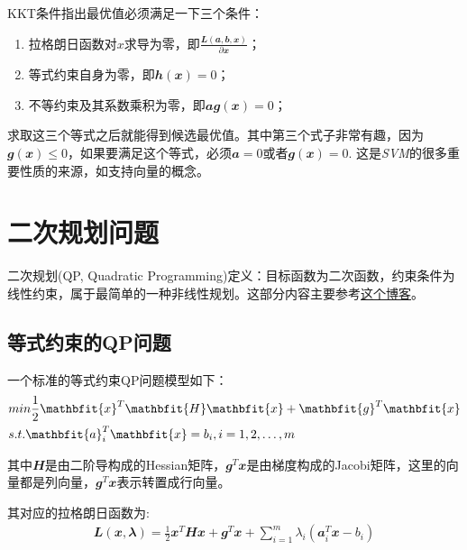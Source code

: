 KKT条件指出最优值必须满足一下三个条件：
\begin{enumerate}
  \item 拉格朗日函数对$x$求导为零，即$\frac{\mathbfit{L}(\mathbfit{a},\mathbfit{b},\mathbfit{x})}{\partial \mathbfit{x}}$；
  \item 等式约束自身为零，即$\mathbfit{h}(\mathbfit{x})=0$；
  \item 不等约束及其系数乘积为零，即$\mathbfit{a}\mathbfit{g}(\mathbfit{x})=0$；
\end{enumerate}

求取这三个等式之后就能得到候选最优值。其中第三个式子非常有趣，因为$\mathbfit{g}(\mathbfit{x})\leq 0$，如果要满足这个等式，必须$\mathbfit{a}=0$或者$\mathbfit{g}(\mathbfit{x})= 0$. 这是\emph{SVM}的很多重要性质的来源，如支持向量的概念。







\section{二次规划问题}

二次规划(QP, Quadratic Programming)定义：目标函数为二次函数，约束条件为线性约束，属于最简单的一种非线性规划。这部分内容主要参考\href{https://zhuanlan.zhihu.com/p/375762164}{这个博客}。




\subsection{等式约束的QP问题}

一个标准的等式约束QP问题模型如下：
\begin{align}
  &min \quad \frac{1}{2}\mathbfit{x}^T\mathbfit{H}\mathbfit{x}+\mathbfit{g}^T\mathbfit{x} \notag\\
  &s.t. \quad \mathbfit{a}_i^T\mathbfit{x}=b_i, \quad i = 1, 2, \dots, m
\end{align}

其中$\mathbfit{H}$是由二阶导构成的Hessian矩阵，$\mathbfit{g}^T\mathbfit{x}$是由梯度构成的Jacobi矩阵，这里的向量都是列向量，$\mathbfit{g}^T\mathbfit{x}$表示转置成行向量。

其对应的拉格朗日函数为:
\begin{align}
  \mathbfit{L}(\mathbfit{x},\mathbfit{\lambda})=\frac{1}{2}\mathbfit{x}^T\mathbfit{H}\mathbfit{x}+\mathbfit{g}^T\mathbfit{x}+\sum_{i=1}^{m}\lambda_i(\mathbfit{a}_i^T\mathbfit{x}-b_i)
\end{align}

